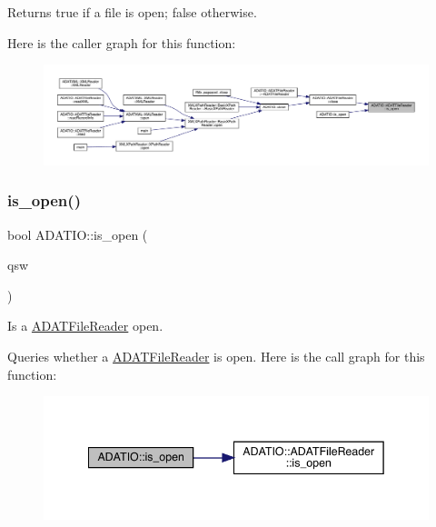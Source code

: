 \begin{DoxyReturn}{Returns}
true if a file is open; false otherwise. 
\end{DoxyReturn}
Here is the caller graph for this function\+:\nopagebreak
\begin{figure}[H]
\begin{center}
\leavevmode
\includegraphics[width=350pt]{db/de5/group__qio_ga601972c66a6e6671d7b41ee1bce80e82_icgraph}
\end{center}
\end{figure}
\mbox{\label{group__qio_gad9b8cab72f011dd46c24a51e8a1c756a}} 
\subsubsection{\texorpdfstring{is\_open()}{is\_open()}\hspace{0.1cm}{\footnotesize\ttfamily [2/2]}}
{\footnotesize\ttfamily bool A\+D\+A\+T\+I\+O\+::is\+\_\+open (\begin{DoxyParamCaption}\item[{\mbox{\hyperlink{classADATIO_1_1ADATFileReader}{A\+D\+A\+T\+File\+Reader}} \&}]{qsw }\end{DoxyParamCaption})}



Is a \mbox{\hyperlink{classADATIO_1_1ADATFileReader}{A\+D\+A\+T\+File\+Reader}} open. 

Queries whether a \mbox{\hyperlink{classADATIO_1_1ADATFileReader}{A\+D\+A\+T\+File\+Reader}} is open. Here is the call graph for this function\+:\nopagebreak
\begin{figure}[H]
\begin{center}
\leavevmode
\includegraphics[width=342pt]{db/de5/group__qio_gad9b8cab72f011dd46c24a51e8a1c756a_cgraph}
\end{center}
\end{figure}
\mbox{\label{group__qio_ga3498ab9948d446056dee8f2808e05c78}} 
